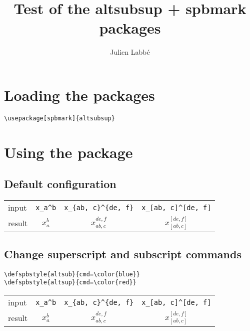 \documentclass{article}
\title{Test of the \textsf{altsubsup} + \textsf{spbmark} packages}
\author{Julien Labb\'e}
\begin{document}
\maketitle

\renewcommand{\arraystretch}{1.5}

\section{Loading the packages}

\begin{verbatim}
\usepackage[spbmark]{altsubsup}
\end{verbatim}

\section{Using the package}

\subsection{Default configuration}

\begin{center}
  \begin{tabular}{lccc}
    \hline
    input & \verb|x_a^b| & \verb|x_{ab, c}^{de, f}|   & \verb|x_[ab, c]^[de, f]| \\
    result & $x_a^b$ & $x_{ab, c}^{de, f}$  & $x_[ab, c]^[de, f]$ \\
    \hline
  \end{tabular}
\end{center}

\subsection{Change superscript and subscript commands}

\begin{verbatim}
\defspbstyle{altsub}{cmd=\color{blue}}
\defspbstyle{altsup}{cmd=\color{red}}
\end{verbatim}


\begin{center}
  \begin{tabular}{lccc}
    \hline
    input & \verb|x_a^b| & \verb|x_{ab, c}^{de, f}|   & \verb|x_[ab, c]^[de, f]| \\
    result & $x_a^b$ & $x_{ab, c}^{de, f}$  & $x_[ab, c]^[de, f]$ \\
    \hline
  \end{tabular}
\end{center}
\end{document}
